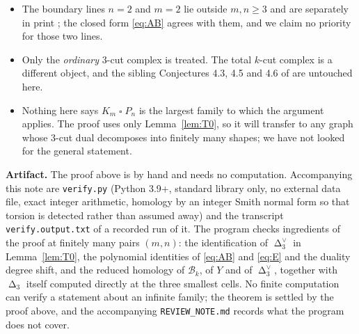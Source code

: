 \documentclass[11pt]{amsart}
\DeclareMathOperator{\Cut}{\Delta}
\newcommand{\Dual}[1]{#1^{\vee}}
\newcommand{\bbox}{\mathbin{\square}}
\begin{document}
\begin{itemize}
  \item The boundary lines $n=2$ and $m=2$ lie outside $m,n\ge3$ and are separately in print
        \cite{BayerI, BayerII}; the closed form \eqref{eq:AB} agrees with them, and we claim no
        priority for those two lines.
  \item Only the \emph{ordinary} $3$-cut complex is treated. The total $k$-cut complex is a
        different object, and the sibling Conjectures 4.3, 4.5 and 4.6 of \cite{CSV} are untouched
        here.
  \item Nothing here says $K_m \bbox P_n$ is the largest family to which the argument applies. The
        proof uses only Lemma~\ref{lem:T0}, so it will transfer to any graph whose $3$-cut dual
        decomposes into finitely many shapes; we have not looked for the general statement.
\end{itemize}

\medskip
\noindent\textbf{Artifact.}
The proof above is by hand and needs no computation. Accompanying this note are \texttt{verify.py}
(Python 3.9+, standard library only, no external data file, exact integer arithmetic, homology by
an integer Smith normal form so that torsion is detected rather than assumed away) and the
transcript \texttt{verify.output.txt} of a recorded run of it. The program checks ingredients of
the proof at finitely many pairs $(m,n)$: the identification of $\Dual{\Cut_3}$ in
Lemma~\ref{lem:T0}, the polynomial identities of \eqref{eq:AB} and \eqref{eq:E} and the duality
degree shift, and the reduced homology of $\mathcal B_k$, of $Y$ and of $\Dual{\Cut_3}$, together
with $\Cut_3$ itself computed directly at the three smallest cells. No finite computation can
verify a statement about an infinite family; the theorem is settled by the proof above, and the
accompanying \texttt{REVIEW\_NOTE.md} records what the program does not cover.
\end{document}
